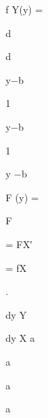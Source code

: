 \documentclass[a4paper,portrait,12pt]{article}
\begin{document}
\begin{flushleft}
f Y(y) =
\end{flushleft}





\begin{flushleft}
d
\end{flushleft}


\begin{flushleft}
d
\end{flushleft}


\begin{flushleft}
y$-$b
\end{flushleft}


1


\begin{flushleft}
y$-$b
\end{flushleft}


1


\begin{flushleft}
y $-$b
\end{flushleft}


\begin{flushleft}
F (y) =
\end{flushleft}


\begin{flushleft}
F
\end{flushleft}


\begin{flushleft}
= FX′
\end{flushleft}


\begin{flushleft}
= fX
\end{flushleft}


.


\begin{flushleft}
dy Y
\end{flushleft}


\begin{flushleft}
dy X a
\end{flushleft}


\begin{flushleft}
a
\end{flushleft}


\begin{flushleft}
a
\end{flushleft}


\begin{flushleft}
a
\end{flushleft}
\end{document}
